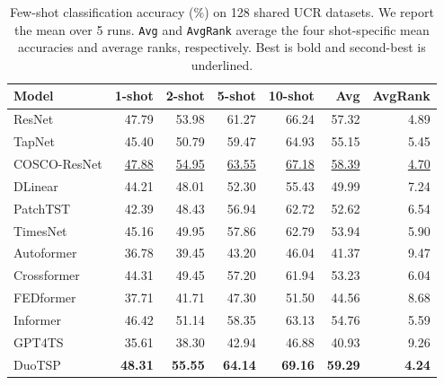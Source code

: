 \begin{table}[t]
\centering
\caption{Few-shot classification accuracy (\%) on 128 shared UCR datasets. We report the mean over 5 runs. \texttt{Avg} and \texttt{AvgRank} average the four shot-specific mean accuracies and average ranks, respectively. Best is bold and second-best is underlined.}
\label{tab:ucr_fewshot_paper_current-fewshot-main}
\begin{tabular}{lrrrrrr}
\toprule
Model & 1-shot & 2-shot & 5-shot & 10-shot & Avg & AvgRank \\
\midrule
ResNet & 47.79 & 53.98 & 61.27 & 66.24 & 57.32 & 4.89 \\
TapNet & 45.40 & 50.79 & 59.47 & 64.93 & 55.15 & 5.45 \\
COSCO-ResNet & \underline{47.88} & \underline{54.95} & \underline{63.55} & \underline{67.18} & \underline{58.39} & \underline{4.70} \\
DLinear & 44.21 & 48.01 & 52.30 & 55.43 & 49.99 & 7.24 \\
PatchTST & 42.39 & 48.43 & 56.94 & 62.72 & 52.62 & 6.54 \\
TimesNet & 45.16 & 49.95 & 57.86 & 62.79 & 53.94 & 5.90 \\
Autoformer & 36.78 & 39.45 & 43.20 & 46.04 & 41.37 & 9.47 \\
Crossformer & 44.31 & 49.45 & 57.20 & 61.94 & 53.23 & 6.04 \\
FEDformer & 37.71 & 41.71 & 47.30 & 51.50 & 44.56 & 8.68 \\
Informer & 46.42 & 51.14 & 58.35 & 63.13 & 54.76 & 5.59 \\
GPT4TS & 35.61 & 38.30 & 42.94 & 46.88 & 40.93 & 9.26 \\
DuoTSP & \textbf{48.31} & \textbf{55.55} & \textbf{64.14} & \textbf{69.16} & \textbf{59.29} & \textbf{4.24} \\
\bottomrule
\end{tabular}
\end{table}
